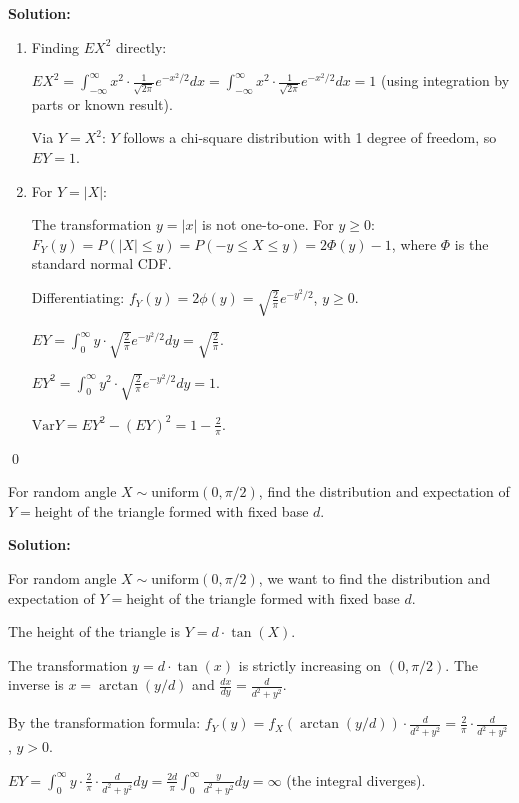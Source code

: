 \noindent\textbf{Solution:}
\begin{enumerate}[label=(\alph*)]
    \item Finding $EX^2$ directly:
    
    $EX^2 = \int_{-\infty}^{\infty} x^2 \cdot \frac{1}{\sqrt{2\pi}}e^{-x^2/2}dx = \int_{-\infty}^{\infty} x^2 \cdot \frac{1}{\sqrt{2\pi}}e^{-x^2/2}dx = 1$ (using integration by parts or known result).
    
    Via $Y = X^2$: $Y$ follows a chi-square distribution with 1 degree of freedom, so $EY = 1$.
    
    \item For $Y = |X|$:
    
    The transformation $y = |x|$ is not one-to-one. For $y \geq 0$:
    $F_Y(y) = P(|X| \leq y) = P(-y \leq X \leq y) = 2\Phi(y) - 1$, where $\Phi$ is the standard normal CDF.
    
    Differentiating: $f_Y(y) = 2\phi(y) = \sqrt{\frac{2}{\pi}}e^{-y^2/2}$, $y \geq 0$.
    
    $EY = \int_0^\infty y \cdot \sqrt{\frac{2}{\pi}}e^{-y^2/2}dy = \sqrt{\frac{2}{\pi}}$.
    
    $EY^2 = \int_0^\infty y^2 \cdot \sqrt{\frac{2}{\pi}}e^{-y^2/2}dy = 1$.
    
    $\text{Var}Y = EY^2 - (EY)^2 = 1 - \frac{2}{\pi}$.
\end{enumerate}


\qed
\begin{problembox}
For random angle $X\sim\text{uniform}(0,\pi/2)$, find the distribution and expectation of $Y=\text{height}$ of the triangle formed with fixed base $d$.
\end{problembox}

\noindent\textbf{Solution:}

For random angle $X \sim \text{uniform}(0,\pi/2)$, we want to find the distribution and expectation of $Y = \text{height}$ of the triangle formed with fixed base $d$.

The height of the triangle is $Y = d \cdot \tan(X)$.

The transformation $y = d \cdot \tan(x)$ is strictly increasing on $(0,\pi/2)$. The inverse is $x = \arctan(y/d)$ and $\frac{dx}{dy} = \frac{d}{d^2 + y^2}$.

By the transformation formula: $f_Y(y) = f_X(\arctan(y/d)) \cdot \frac{d}{d^2 + y^2} = \frac{2}{\pi} \cdot \frac{d}{d^2 + y^2}$, $y > 0$.

$EY = \int_0^\infty y \cdot \frac{2}{\pi} \cdot \frac{d}{d^2 + y^2}dy = \frac{2d}{\pi} \int_0^\infty \frac{y}{d^2 + y^2}dy = \infty$ (the integral diverges).


